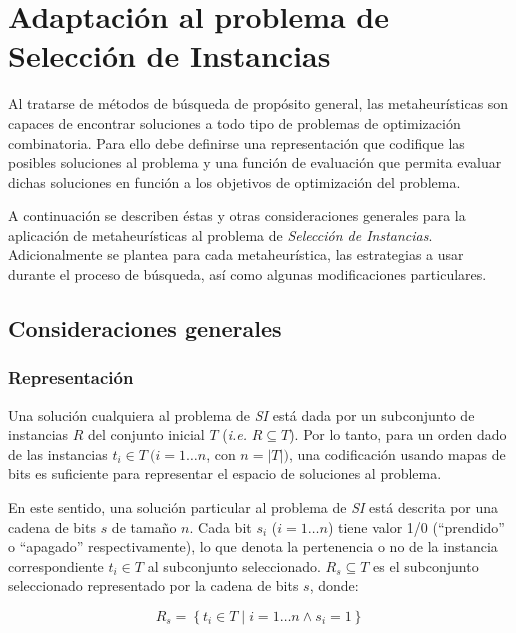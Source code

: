 \chapter{Adaptación al problema de Selección de Instancias}
\label{capitulo3}

Al tratarse de métodos de búsqueda de propósito general, las metaheurísticas son capaces de encontrar soluciones a todo tipo de problemas de optimización combinatoria. Para ello debe definirse una representación que codifique las posibles soluciones al problema y una función de evaluación que permita evaluar dichas soluciones en función a los objetivos de optimización del problema.

A continuación se describen éstas y otras consideraciones generales para la aplicación de metaheurísticas al problema de \emph{Selección de Instancias}. Adicionalmente se plantea para cada metaheurística, las estrategias a usar durante el proceso de búsqueda, así como algunas modificaciones particulares.

\section{Consideraciones generales}

\subsection{Representación}

Una solución cualquiera al problema de \emph{SI} está dada por un subconjunto de instancias $R$ del conjunto inicial $T$ (\emph{i.e.} $R \subseteq T$). Por lo tanto, para un orden dado de las instancias $t_i \in T\ (i = 1 \dots n$, con $n = \vert T \vert)$, una codificación usando mapas de bits es suficiente para representar el espacio de soluciones al problema.

En este sentido, una solución particular al problema de \emph{SI} está descrita por una cadena de bits $s$ de tamaño $n$. Cada bit $s_i$ ($i = 1 \dots n$) tiene valor 1/0 (``prendido'' o ``apagado'' respectivamente), lo que denota la pertenencia o no de la instancia correspondiente $t_i \in T$ al subconjunto seleccionado. $R_s \subseteq T$ es el subconjunto seleccionado representado por la cadena de bits $s$, donde:

\begin{equation}
R_s = \left\lbrace t_i \in T \mid i = 1 \dots n \land s_i = 1 \right\rbrace
\end{equation}

